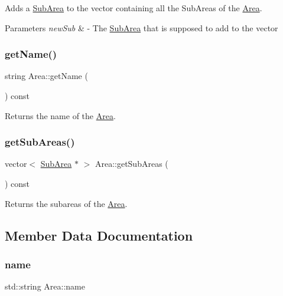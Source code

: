 Adds a \mbox{\hyperlink{classSubArea}{Sub\+Area}} to the vector containing all the Sub\+Areas of the \mbox{\hyperlink{classArea}{Area}}. 


\begin{DoxyParams}{Parameters}
{\em new\+Sub} & -\/ The \mbox{\hyperlink{classSubArea}{Sub\+Area}} that is supposed to add to the vector \\
\hline
\end{DoxyParams}
\mbox{\label{classArea_acdbc3527be262d1ea1b9c961e823257f}} 
\subsubsection{\texorpdfstring{get\+Name()}{getName()}}
{\footnotesize\ttfamily string Area\+::get\+Name (\begin{DoxyParamCaption}{ }\end{DoxyParamCaption}) const}



Returns the name of the \mbox{\hyperlink{classArea}{Area}}. 

\mbox{\label{classArea_abf3bfb978d0a7d05fe2cbbad9ce7fef4}} 
\subsubsection{\texorpdfstring{get\+Sub\+Areas()}{getSubAreas()}}
{\footnotesize\ttfamily vector$<$ \mbox{\hyperlink{classSubArea}{Sub\+Area}} $\ast$ $>$ Area\+::get\+Sub\+Areas (\begin{DoxyParamCaption}{ }\end{DoxyParamCaption}) const}



Returns the subareas of the \mbox{\hyperlink{classArea}{Area}}. 



\subsection{Member Data Documentation}
\mbox{\label{classArea_a24201719de9d9dfef7a720c036529dd7}} 
\subsubsection{\texorpdfstring{name}{name}}
{\footnotesize\ttfamily std\+::string Area\+::name\hspace{0.3cm}{\ttfamily [private]}}



